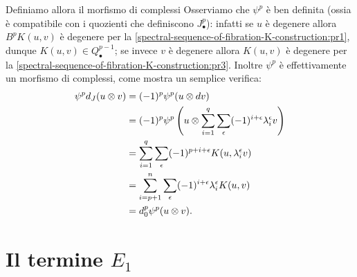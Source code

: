 Definiamo allora il morfismo di complessi
Osserviamo che \(\psi^p\) è ben definita (ossia è compatibile con i quozienti che definiscono \(J^p_\bullet\)): infatti se \(u\) è degenere allora \(B^pK(u,v)\) è degenere per la \ref{spectral-sequence-of-fibration-K-construction:pr1}, dunque \(K(u,v)\in Q^{p-1}_\bullet\); se invece \(v\) è degenere allora \(K(u,v)\) è degenere per la \ref{spectral-sequence-of-fibration-K-construction:pr3}. Inoltre \(\psi^p\) è effettivamente un morfismo di complessi, come mostra un semplice verifica:
\begin{align*}
\psi^pd_J(u\mathbin{\otimes} v)&=(-1)^p\psi^p(u\mathbin{\otimes} dv)\\
&=(-1)^p\psi^p\left(u\mathbin{\otimes}\sum_{i=1}^q\sum_\epsilon(-1)^{i+\epsilon}\lambda^\epsilon_iv\right)\\
&=\sum_{i=1}^q\sum_\epsilon(-1)^{p+i+\epsilon}K(u,\lambda^\epsilon_iv)\\
&=\sum_{i=p+1}^n\sum_\epsilon(-1)^{i+\epsilon}\lambda^\epsilon_iK(u,v)\\
&=d^p_0\psi^p(u\mathbin{\otimes} v).
\end{align*}

\section{Il termine \texorpdfstring{\(E_1\)}{E1}}


